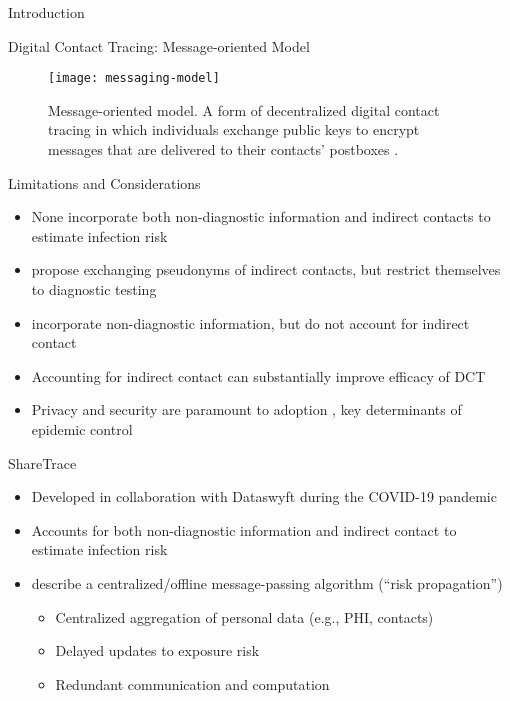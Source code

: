\documentclass[11pt]{beamer}
\begin{document}
\begin{section}{Introduction}
\begin{frame}{Digital Contact Tracing: Message-oriented Model}
\begin{figure}
  \centering
  \texttt{[image: messaging-model]}
  \caption[Message-oriented model]{Message-oriented model. A form of decentralized digital contact tracing in which individuals exchange public keys to encrypt messages that are delivered to their contacts' postboxes \cite{Reichert2021}.}
\end{figure}
\end{frame}

\begin{frame}{Limitations and Considerations}
\begin{itemize}
  \item None incorporate both non-diagnostic information and indirect contacts to estimate infection risk
  \pause
  \item \citet{Cherini2023} propose exchanging pseudonyms of indirect contacts, but restrict themselves to diagnostic testing
  \pause
  \item \citet{Gupta2023} incorporate non-diagnostic information, but do not account for indirect contact
  \pause
  \item Accounting for indirect contact can substantially improve efficacy of DCT \citep{PozoMartin2023}
  \pause
  \item Privacy and security are paramount to adoption \citep{Oyibo2022, Afroogh2022}, key determinants of epidemic control \citep{PozoMartin2023}
\end{itemize}
\end{frame}

\begin{frame}{ShareTrace}
\begin{itemize}
  \item Developed in collaboration with Dataswyft during the COVID-19 pandemic \citep{Ayday2020}
  \pause
  \item Accounts for both non-diagnostic information and indirect contact to estimate infection risk
  \pause
  \item \citet{Ayday2021} describe a centralized/offline message-passing algorithm (``risk propagation'')
    \begin{itemize}
      \item Centralized aggregation of personal data (e.g., PHI, contacts)
      \pause
      \item Delayed updates to exposure risk
      \pause
      \item Redundant communication and computation
    \end{itemize}
\end{itemize}
\end{frame}


\end{section}
\end{document}
